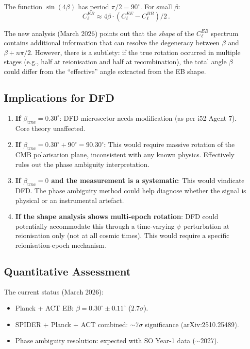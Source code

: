 \documentclass[11pt,a4paper]{article}
\begin{document}
The function $\sin(4\beta)$ has period $\pi/2 = 90^\circ$. For small $\beta$:
\begin{equation}
C_\ell^{EB} \approx 4\beta \cdot (C_\ell^{EE} - C_\ell^{BB})/2\,.
\end{equation}

The new analysis (March 2026) points out that the \emph{shape} of the $C_\ell^{EB}$ spectrum contains additional information that can resolve the degeneracy between $\beta$ and $\beta + n\pi/2$. However, there is a subtlety: if the true rotation occurred in multiple stages (e.g., half at reionisation and half at recombination), the total angle $\beta$ could differ from the ``effective'' angle extracted from the EB shape.

\subsection{Implications for DFD}

\begin{enumerate}
\item \textbf{If $\beta_{\mathrm{true}} = 0.30^\circ$}: DFD microsector needs modification (as per i52 Agent 7). Core theory unaffected.

\item \textbf{If $\beta_{\mathrm{true}} = 0.30^\circ + 90^\circ = 90.30^\circ$}: This would require massive rotation of the CMB polarisation plane, inconsistent with any known physics. Effectively rules out the phase ambiguity interpretation.

\item \textbf{If $\beta_{\mathrm{true}} = 0$ and the measurement is a systematic}: This would vindicate DFD. The phase ambiguity method could help diagnose whether the signal is physical or an instrumental artefact.

\item \textbf{If the shape analysis shows multi-epoch rotation}: DFD could potentially accommodate this through a time-varying $\psi$ perturbation at reionisation only (not at all cosmic times). This would require a specific reionisation-epoch mechanism.
\end{enumerate}

\subsection{Quantitative Assessment}

The current status (March 2026):
\begin{itemize}
\item Planck + ACT EB: $\beta = 0.30^\circ \pm 0.11^\circ$ ($2.7\sigma$).
\item SPIDER + Planck + ACT combined: $\sim 7\sigma$ significance (arXiv:2510.25489).
\item Phase ambiguity resolution: expected with SO Year-1 data ($\sim$2027).
\end{itemize}
\end{document}
